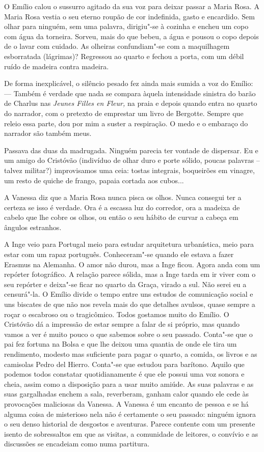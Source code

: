 O Emílio calou o sussurro agitado da sua voz para deixar passar a Maria
Rosa. A Maria Rosa vestia o seu eterno roupão de cor indefinida, gasto e
encardido. Sem olhar para ninguém, sem uma palavra, dirigiu"-se à cozinha
e encheu um copo com água da torneira. Sorveu, mais do que bebeu, a água
e pousou o copo depois de o lavar com cuidado. As olheiras confundiam"-se com a maquilhagem esborratada (lágrimas)? Regressou ao quarto e
fechou a porta, com um débil ruído de madeira contra madeira.

De forma inexplicável, o silêncio pesado fez ainda mais sumida a voz do
Emílio: --- Também é verdade que nada se compara àquela intensidade
sinistra do barão de Charlus nas \emph{Jeunes Filles en Fleur, }na praia
e depois quando entra no quarto do narrador, com o pretexto de emprestar
um livro de
Bergotte. Sempre que releio essa parte, dou por mim a suster a
respiração. O medo e o embaraço do narrador são também meus.

Passava das duas da madrugada. Ninguém parecia ter vontade de dispersar.
Eu e um amigo do Cristóvão (indivíduo de olhar duro e porte sólido,
poucas palavras -- talvez militar?) improvisamos uma ceia: tostas
integrais, boqueirões em vinagre, um resto de quiche de frango, papaia
cortada aos cubos...

A Vanessa diz que a Maria Rosa nunca pisca os olhos. Nunca consegui ter
a certeza se isso é verdade. Ora é a escassa luz do corredor, ora a
madeixa de cabelo que lhe cobre os olhos, ou então o seu hábito de
curvar a cabeça em ângulos estranhos.

\medskip
\asterisc
\medskip


A Inge veio para Portugal meio para estudar arquitetura urbanística,
meio para estar com um rapaz português. Conheceram"-se quando ele
estava a fazer Erasmus na Alemanha. O amor não durou, mas a Inge ficou.
Agora anda com um repórter fotográfico. A relação parece sólida, mas a
Inge tarda em ir viver com o seu repórter e deixa"-se ficar no quarto da
Graça, virado a sul. Não serei eu a censurá"-la. O Emílio divide o tempo
entre uns estudos de comunicação social e uns biscates de que não nos
revela mais do que detalhes avulsos, quase sempre a roçar o escabroso ou
o tragicômico. Todos gostamos muito do Emílio. O Cristóvão dá a
impressão de estar sempre a falar de si próprio, mas quando vamos a ver
é muito pouco o que sabemos sobre o seu passado. Conta"-se que o pai fez fortuna
na Bolsa e que lhe deixou uma quantia de onde ele tira um rendimento,
modesto mas suficiente para pagar o quarto, a comida, os livros e as
camisolas Pedro del Hierro. Conta"-se que estudou para barítono. Aquilo
que podemos todos constatar quotidianamente é que ele possui uma voz
sonora e cheia, assim como a disposição para a usar muito amiúde. As
suas palavras e as suas gargalhadas enchem a sala, reverberam, ganham
calor quando ele cede às provocações maliciosas da Vanessa. A Vanessa é
um encanto de pessoa e se há alguma coisa de misterioso nela não é
certamente o seu passado: ninguém ignora o seu denso historial de
desgostos e aventuras. Parece contente com um presente isento de sobressaltos em que as visitas, a comunidade de leitores, o convívio e as
discussões se encadeiam como numa partitura.

